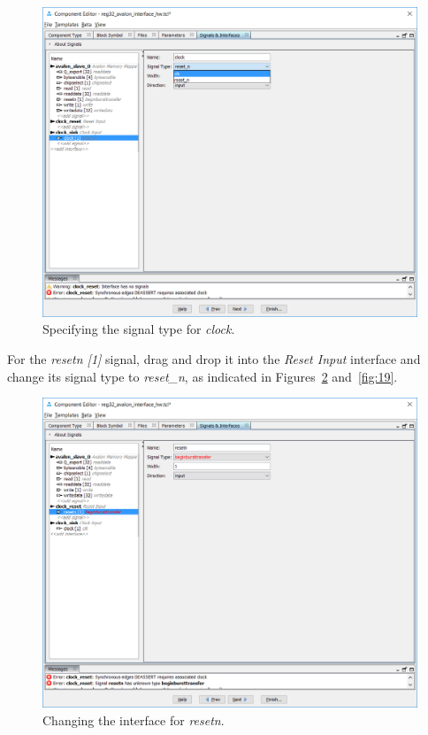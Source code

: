 \documentclass[11pt, twoside, pdftex]{article}
\begin{document}
\clearpage

\begin{figure}[H]
   \begin{center}
        \includegraphics[scale=0.6]{figures/figure17.png}
   \end{center}
   \caption{Specifying the signal type for {\it clock}.}
	\label{fig:17}
\end{figure}

\clearpage
\newpage
For the {\it resetn [1]} signal, drag and drop it into the {\it Reset Input} interface
and change its signal type to {\it reset\_n}, as indicated in Figures~\ref{fig:18} 
and~\ref{fig:19}.

\begin{figure}[H]
   \begin{center}
        \includegraphics[scale=0.6]{figures/figure18.png}
   \end{center}
    \caption{Changing the interface for {\it resetn}.}
	\label{fig:18}
\end{figure}
\end{document}
